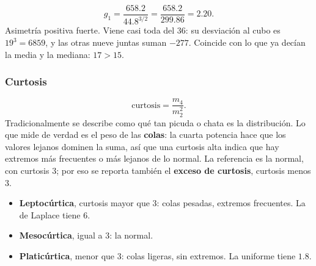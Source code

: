 \documentclass[11pt,letterpaper]{article}
\begin{document}
\begin{ejemplo}
    \[
        g_1 = \frac{658.2}{44.8^{3/2}} = \frac{658.2}{299.86} = 2.20 .
    \]
    Asimetría positiva fuerte. Viene casi toda del $36$: su desviación
    al cubo es $19^3 = 6859$, y las otras nueve juntas suman $-277$.
    Coincide con lo que ya decían la media y la mediana: $17 > 15$.
\end{ejemplo}

\subsubsection*{Curtosis}

\[
    \text{curtosis} = \frac{m_4}{m_2^2} .
\]
Tradicionalmente se describe como qué tan picuda o chata es la
distribución. Lo que mide de verdad es el peso de las \textbf{colas}:
la cuarta potencia hace que los valores lejanos dominen la suma, así
que una curtosis alta indica que hay extremos más frecuentes o más
lejanos de lo normal. La referencia es la normal, con curtosis $3$; por
eso se reporta también el \textbf{exceso de curtosis}, curtosis menos
$3$.

\begin{itemize}[itemsep=0.3em]
    \item \textbf{Leptocúrtica}, curtosis mayor que $3$: colas pesadas,
          extremos frecuentes. La de Laplace tiene $6$.
    \item \textbf{Mesocúrtica}, igual a $3$: la normal.
    \item \textbf{Platicúrtica}, menor que $3$: colas ligeras, sin
          extremos. La uniforme tiene $1.8$.
\end{itemize}

\begin{center}
\end{center}
\end{document}
